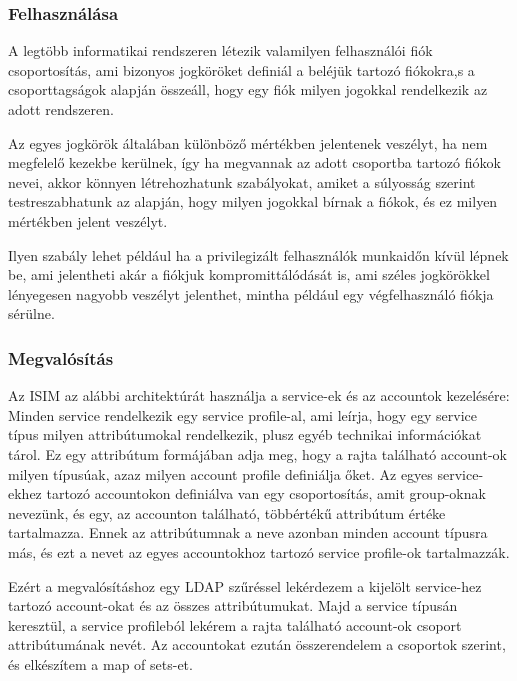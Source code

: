 	\subsubsection{Felhasználása}
		A legtöbb informatikai rendszeren létezik valamilyen felhasználói fiók csoportosítás, ami bizonyos jogköröket definiál a beléjük tartozó fiókokra,s a csoporttagságok alapján összeáll, hogy egy fiók milyen jogokkal rendelkezik az adott rendszeren. 
		
		Az egyes jogkörök általában különböző mértékben jelentenek veszélyt, ha nem megfelelő kezekbe kerülnek, így ha megvannak az adott csoportba tartozó fiókok nevei, akkor könnyen létrehozhatunk szabályokat, amiket a súlyosság szerint testreszabhatunk az alapján, hogy milyen jogokkal bírnak a fiókok, és ez milyen mértékben jelent veszélyt.
		 
		Ilyen szabály lehet például ha a privilegizált felhasználók munkaidőn kívül lépnek be, ami jelentheti akár a fiókjuk kompromittálódását is, ami széles jogkörökkel lényegesen nagyobb veszélyt jelenthet, mintha például egy végfelhasználó fiókja sérülne.
		
	\subsubsection{Megvalósítás}

		Az ISIM az alábbi architektúrát használja a service-ek és az accountok kezelésére: Minden service rendelkezik egy service profile-al, ami leírja, hogy egy service típus milyen attribútumokal rendelkezik, plusz egyéb technikai információkat tárol. Ez egy attribútum formájában adja meg, hogy a rajta található account-ok milyen típusúak, azaz milyen account profile definiálja őket. Az egyes service-ekhez tartozó accountokon definiálva van egy csoportosítás, amit group-oknak nevezünk, és egy, az accounton található, többértékű attribútum értéke tartalmazza. Ennek az attribútumnak a neve azonban minden account típusra más, és ezt a nevet az egyes accountokhoz tartozó service profile-ok tartalmazzák.
		
		Ezért a megvalósításhoz egy LDAP szűréssel lekérdezem a kijelölt service-hez tartozó account-okat és az összes attribútumukat. Majd a service típusán keresztül, a service profileból lekérem a rajta található account-ok csoport attribútumának nevét. Az accountokat ezután összerendelem a csoportok szerint, és elkészítem a map of sets-et.
	
	

